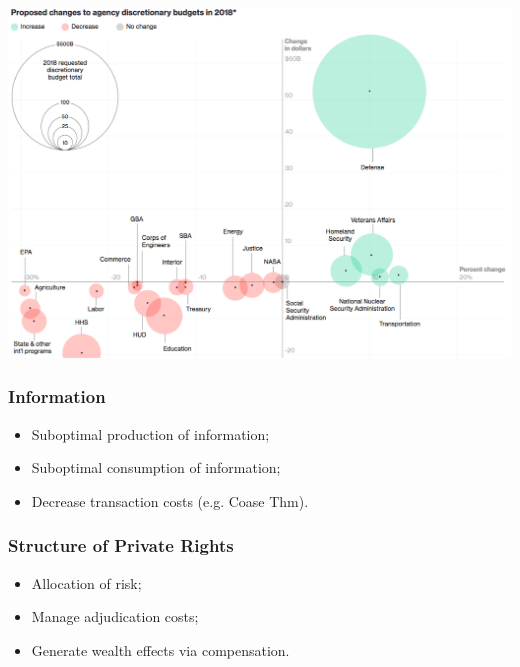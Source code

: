\documentclass[aspectratio=169]{beamer}
\theoremstyle{principle}
\begin{document}
\begin{frame}
    \begin{center}
     \includegraphics[scale=0.3]{budget-2018.png}
     \end{center}
\end{frame}

\begin{frame}
\frametitle{Information}
\begin{itemize}
\item Suboptimal production of information;
\bigskip
\bigskip
\bigskip
\item Suboptimal consumption of information;
\bigskip
\bigskip
\bigskip
\item Decrease transaction costs (e.g. Coase Thm).
\end{itemize}

\end{frame}

\begin{frame}
\frametitle{Structure of Private Rights}
\begin{itemize}
\item Allocation of risk;
\bigskip
\bigskip
\bigskip
\item Manage adjudication costs;
\bigskip
\bigskip
\bigskip
\item Generate wealth effects via compensation.
\end{itemize}

\end{frame}
\end{document}
